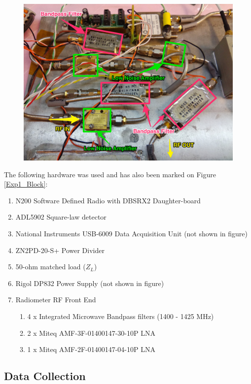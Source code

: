 {\begin{figure}[h!tb] \centering
\includegraphics[width=\textwidth]{Images/ISU_RF_noted.jpg}
\label{ISURF}
\end{figure}
}

The following hardware was used and has also been marked on Figure \ref{Exp1_Block}:

\begin{enumerate}
\item N200 Software Defined Radio with DBSRX2 Daughter-board
\item ADL5902 Square-law detector
\item National Instruments USB-6009 Data Acquisition Unit (not shown in figure)
\item ZN2PD-20-S+ Power Divider
\item 50-ohm matched load ($Z_L$)
\item Rigol DP832 Power Supply (not shown in figure)
\item Radiometer RF Front End
\begin{enumerate}
\item 4 x Integrated Microwave Bandpass filters (1400 - 1425 MHz)
\item 2 x Miteq AMF-3F-01400147-30-10P LNA
\item 1 x Miteq AMF-2F-01400147-04-10P LNA
\end{enumerate}
\end{enumerate}

\subsection{Data Collection}\label{exp1_data}

